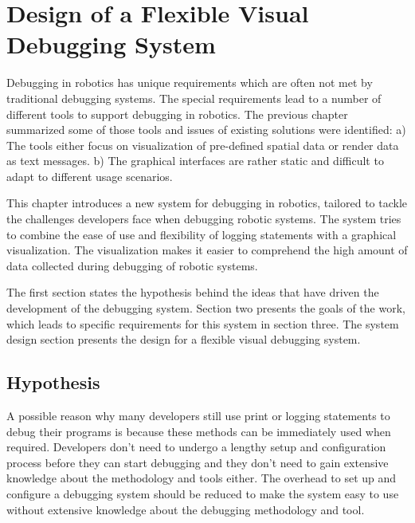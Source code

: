 \chapter{Design of a Flexible Visual Debugging System}
\label{visual_debugging_system}

Debugging in robotics has unique requirements which are often not met by traditional debugging systems. The special requirements lead to a number of different tools to support debugging in robotics. The previous chapter summarized some of those tools and issues of existing solutions were identified: a) The tools either focus on visualization of pre-defined spatial data or render data as text messages. b) The graphical interfaces are rather static and difficult to adapt to different usage scenarios.

This chapter introduces a new system for debugging in robotics, tailored to tackle the challenges developers face when debugging robotic systems. The system tries to combine the ease of use and flexibility of logging statements with a graphical visualization. The visualization makes it easier to comprehend the high amount of data collected during debugging of robotic systems.

The first section states the hypothesis behind the ideas that have driven the development of the debugging system. Section two presents the goals of the work, which leads to specific requirements for this system in section three. The system design section presents the design for a flexible visual debugging system.




\section{Hypothesis}
A possible reason why many developers still use print or logging statements to debug their programs is because these methods can be immediately used when required. Developers don't need to undergo a lengthy setup and configuration process before they can start debugging and they don't need to gain extensive knowledge about the methodology and tools either. The overhead to set up and configure a debugging system should be reduced to make the system easy to use without extensive knowledge about the debugging methodology and tool.


